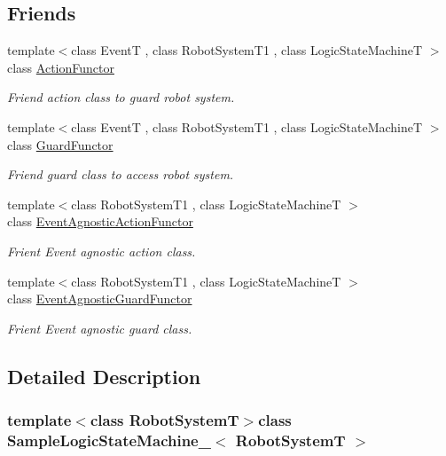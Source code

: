 \subsection*{Friends}
\begin{DoxyCompactItemize}
\item 
{\footnotesize template$<$class Event\-T , class Robot\-System\-T1 , class Logic\-State\-Machine\-T $>$ }\\class \hyperlink{classSampleLogicStateMachine___a05673eb4ec343f36c1f3fb787ac26b94}{Action\-Functor}
\begin{DoxyCompactList}\small\item\em Friend action class to guard robot system. \end{DoxyCompactList}\item 
{\footnotesize template$<$class Event\-T , class Robot\-System\-T1 , class Logic\-State\-Machine\-T $>$ }\\class \hyperlink{classSampleLogicStateMachine___a9411581bb37b54467df520e3c73ceaf0}{Guard\-Functor}
\begin{DoxyCompactList}\small\item\em Friend guard class to access robot system. \end{DoxyCompactList}\item 
{\footnotesize template$<$class Robot\-System\-T1 , class Logic\-State\-Machine\-T $>$ }\\class \hyperlink{classSampleLogicStateMachine___a86a665e36420c3cbc2b45864e023f98a}{Event\-Agnostic\-Action\-Functor}
\begin{DoxyCompactList}\small\item\em Frient Event agnostic action class. \end{DoxyCompactList}\item 
{\footnotesize template$<$class Robot\-System\-T1 , class Logic\-State\-Machine\-T $>$ }\\class \hyperlink{classSampleLogicStateMachine___af372c36475bc4510af791f5cb66608ad}{Event\-Agnostic\-Guard\-Functor}
\begin{DoxyCompactList}\small\item\em Frient Event agnostic guard class. \end{DoxyCompactList}\end{DoxyCompactItemize}


\subsection{Detailed Description}
\subsubsection*{template$<$class Robot\-System\-T$>$class Sample\-Logic\-State\-Machine\-\_\-$<$ Robot\-System\-T $>$}

